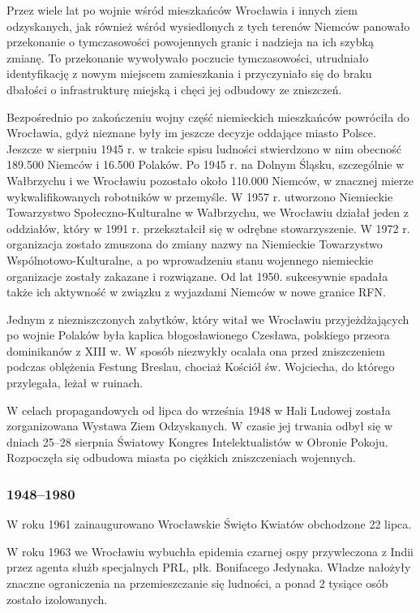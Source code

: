 \documentclass{article}
\begin{document}
Przez wiele lat po wojnie wśród mieszkańców Wrocławia i innych ziem odzyskanych, jak również wśród wysiedlonych z tych terenów Niemców panowało przekonanie o tymczasowości powojennych granic i nadzieja na ich szybką zmianę. To przekonanie wywoływało poczucie tymczasowości, utrudniało identyfikację z nowym miejscem zamieszkania i przyczyniało się do braku dbałości o infrastrukturę miejską i chęci jej odbudowy ze zniszczeń.

Bezpośrednio po zakończeniu wojny część niemieckich mieszkańców powróciła do Wrocławia, gdyż nieznane były im jeszcze decyzje oddające miasto Polsce. Jeszcze w sierpniu 1945 r. w trakcie spisu ludności stwierdzono w nim obecność 189.500 Niemców i 16.500 Polaków. Po 1945 r. na Dolnym Śląsku, szczególnie w Wałbrzychu i we Wrocławiu pozostało około 110.000 Niemców, w znacznej mierze wykwalifikowanych robotników w przemyśle. W 1957 r. utworzono Niemieckie Towarzystwo Społeczno-Kulturalne w Wałbrzychu, we Wrocławiu działał jeden z oddziałów, który w 1991 r. przekształcił się w odrębne stowarzyszenie. W 1972 r. organizacja zostało zmuszona do zmiany nazwy na Niemieckie Towarzystwo Wspólnotowo-Kulturalne, a po wprowadzeniu stanu wojennego niemieckie organizacje zostały zakazane i rozwiązane. Od lat 1950. sukcesywnie spadała także ich aktywność w związku z wyjazdami Niemców w nowe granice RFN.

Jednym z niezniszczonych zabytków, który witał we Wrocławiu przyjeżdżających po wojnie Polaków była kaplica błogosławionego Czesława, polskiego przeora dominikanów z XIII w. W sposób niezwykły ocalała ona przed zniszczeniem podczas oblężenia Festung Breslau, chociaż Kościół św. Wojciecha, do którego przylegała, leżał w ruinach.

W celach propagandowych od lipca do września 1948 w Hali Ludowej została zorganizowana Wystawa Ziem Odzyskanych. W czasie jej trwania odbył się w dniach 25–28 sierpnia Światowy Kongres Intelektualistów w Obronie Pokoju. Rozpoczęła się odbudowa miasta po ciężkich zniszczeniach wojennych.

\subsubsection{1948–1980}

W roku 1961 zainaugurowano Wrocławskie Święto Kwiatów obchodzone 22 lipca.

W roku 1963 we Wrocławiu wybuchła epidemia czarnej ospy przywleczona z Indii przez agenta służb specjalnych PRL, płk. Bonifacego Jedynaka. Władze nałożyły znaczne ograniczenia na przemieszczanie się ludności, a ponad 2 tysiące osób zostało izolowanych.
\end{document}
